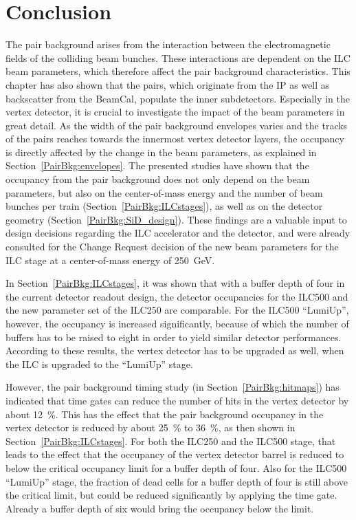 \section{Conclusion}
The pair background arises from the interaction between the electromagnetic fields of the colliding beam bunches.
These interactions are dependent on the ILC beam parameters, which therefore affect the pair background characteristics.
This chapter has also shown that the pairs, which originate from the IP as well as backscatter from the BeamCal, populate the inner \sid subdetectors.
Especially in the vertex detector, it is crucial to investigate the impact of the beam parameters in great detail.
As the width of the pair background envelopes varies and the tracks of the pairs reaches towards the innermost vertex detector layers, the occupancy is directly affected by the change in the beam parameters, as explained in Section~\ref{PairBkg:envelopes}.
The presented studies have shown that the occupancy from the pair background does not only depend on the beam parameters, but also on the center-of-mass energy and the number of beam bunches per train (Section~\ref{PairBkg:ILCstages}), as well as on the \sid detector geometry (Section~\ref{PairBkg:SiD_design}).
These findings are a valuable input to design decisions regarding the ILC accelerator and the \sid detector, and were already consulted for the Change Request decision of the new beam parameters for the ILC stage at a center-of-mass energy of \SI{250}{\GeV}.

In Section~\ref{PairBkg:ILCstages}, it was shown that with a buffer depth of four in the current \sid detector readout design, the detector occupancies for the ILC500 and the new parameter set of the ILC250 are comparable.
For the ILC500 ``LumiUp'', however, the occupancy is increased significantly, because of which the number of buffers has to be raised to eight in order to yield similar detector performances.
According to these results, the \sid vertex detector has to be upgraded as well, when the ILC is upgraded to the ``LumiUp'' stage.

However, the pair background timing study (in Section~\ref{PairBkg:hitmaps}) has indicated that time gates can reduce the number of hits in the vertex detector by about \SI{12}{\percent}.
This has the effect that the pair background occupancy in the vertex detector is reduced by about \SI{25}{\percent} to \SI{36}{\percent}, as then shown in Section~\ref{PairBkg:ILCstages}.
For both the ILC250 and the ILC500 stage, that leads to the effect that the occupancy of the \sid vertex detector barrel is reduced to below the critical occupancy limit for a buffer depth of four.
Also for the ILC500 ``LumiUp'' stage, the fraction of dead cells for a buffer depth of four is still above the critical limit, but could be reduced significantly by applying the time gate.
Already a buffer depth of six would bring the occupancy below the limit.

